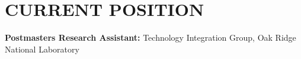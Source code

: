 \section{CURRENT POSITION}
\vspace{0.03in}
{\bf Postmasters Research Assistant:} Technology Integration Group,
Oak Ridge National Laboratory

